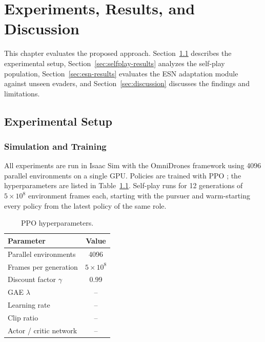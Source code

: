 
\chapter{Experiments, Results, and Discussion}
\label{ch:results}

This chapter evaluates the proposed approach. Section~\ref{sec:setup} describes the experimental setup, Section~\ref{sec:selfplay-results} analyzes the self-play population, Section~\ref{sec:esn-results} evaluates the ESN adaptation module against unseen evaders, and Section~\ref{sec:discussion} discusses the findings and limitations.

\section{Experimental Setup}
\label{sec:setup}

\subsection{Simulation and Training}
\noindent
All experiments are run in Isaac Sim with the OmniDrones framework \cite{xuOmniDronesEfficientFlexible2023} using 4096 parallel environments on a single GPU. %
Policies are trained with PPO \cite{yuSurprisingEffectivenessPPO}; the hyperparameters are listed in Table~\ref{tab:ppo}. Self-play runs for 12 generations of $5 \times 10^8$ environment frames each, starting with the pursuer and warm-starting every policy from the latest policy of the same role.

\begin{table}[t]
    \caption[PPO hyperparameters]{PPO hyperparameters.}
    \label{tab:ppo}
    \begin{center}
        \begin{tabular}{lc}
            \hline\hline
            Parameter                & Value           \\
            \hline
            Parallel environments    & 4096            \\
            Frames per generation    & $5 \times 10^8$ \\
            Discount factor $\gamma$ & 0.99            \\
            GAE $\lambda$            & --              \\
            Learning rate            & --              \\
            Clip ratio               & --              \\
            Actor / critic network   & --              \\
            \hline\hline
        \end{tabular}
    \end{center}
\end{table}

